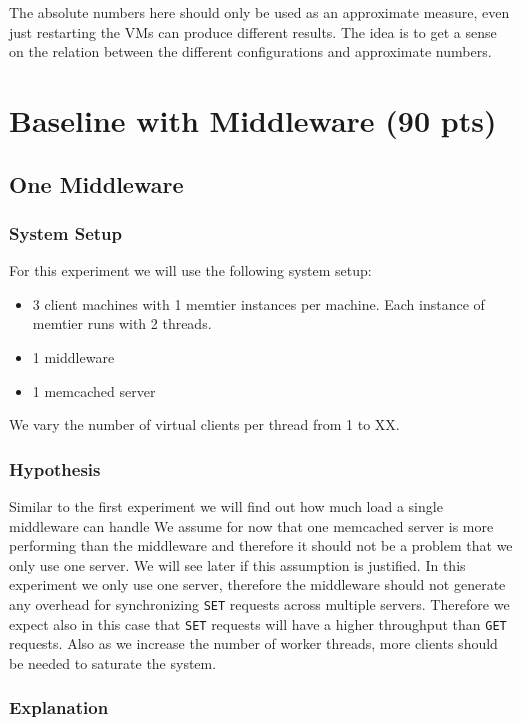 \documentclass[11pt,a4paper]{article}
\begin{document}
%
The absolute numbers here should only be used as an approximate measure, even just restarting the VMs can produce different results. 
%
The idea is to get a sense on the relation between the different configurations and approximate numbers.
%
\section{Baseline with Middleware (90 pts)}
%
\subsection{One Middleware}
%
\subsubsection{System Setup}
%
For this experiment we will use the following system setup:
%
\begin{itemize}
	\item 3 client machines with 1 memtier instances per machine. Each instance of memtier runs with 2 threads.
	\item 1 middleware
	\item 1 memcached server
\end{itemize}
%
We vary the number of virtual clients per thread from 1 to XX.
%
\subsubsection{Hypothesis}
%
Similar to the first experiment we will find out how much load a single middleware can handle
%
We assume for now that one memcached server is more performing than the middleware and therefore it should not be a problem that we only use one server.
%
We will see later if this assumption is justified.
%
In this experiment we only use one server, therefore the middleware should not generate any overhead for synchronizing \texttt{SET} requests across multiple servers.
%
Therefore we expect also in this case that \texttt{SET} requests will have a higher throughput than \texttt{GET} requests.
%
Also as we increase the number of worker threads, more clients should be needed to saturate the system.
%
\subsubsection{Explanation}\label{subsec:one_middleware_explanation}
%
\end{document}
